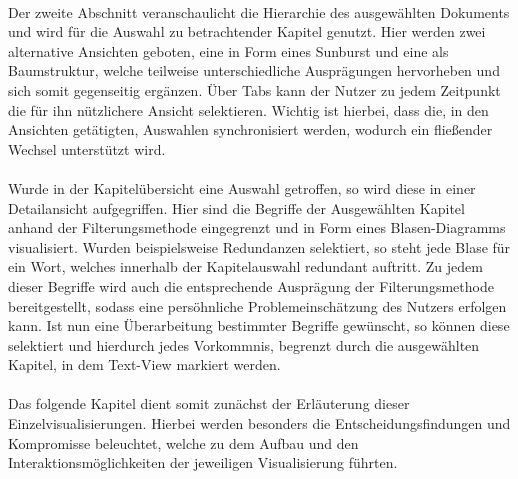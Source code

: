 \\
Der zweite Abschnitt veranschaulicht die Hierarchie des ausgew\"ahlten Dokuments und wird f\"ur die Auswahl zu betrachtender Kapitel genutzt. Hier werden zwei alternative Ansichten geboten, eine in Form eines Sunburst und eine als Baumstruktur, welche teilweise unterschiedliche Auspr\"agungen hervorheben und sich somit gegenseitig erg\"anzen. \"Uber Tabs kann der Nutzer zu jedem Zeitpunkt die f\"ur ihn n\"utzlichere Ansicht selektieren. Wichtig ist hierbei, dass die, in den Ansichten get\"atigten, Auswahlen synchronisiert werden, wodurch ein flie{\ss}ender Wechsel unterst\"utzt wird. \\
\\
Wurde in der Kapitel\"ubersicht eine Auswahl getroffen, so wird diese in einer Detailansicht aufgegriffen. Hier sind die Begriffe der Ausgew\"ahlten Kapitel anhand der Filterungsmethode eingegrenzt und in Form eines Blasen-Diagramms visualisiert. Wurden beispielsweise Redundanzen selektiert, so steht jede Blase f\"ur ein Wort, welches innerhalb der Kapitelauswahl redundant auftritt. Zu jedem dieser Begriffe wird auch die entsprechende Auspr\"agung der Filterungsmethode bereitgestellt, sodass eine pers\"ohnliche Problemeinsch\"atzung des Nutzers erfolgen kann. Ist nun eine \"Uberarbeitung bestimmter Begriffe gew\"unscht, so k\"onnen diese selektiert und hierdurch jedes Vorkommnis, begrenzt durch die ausgew\"ahlten Kapitel, in dem Text-View markiert werden.\\
\\
Das folgende Kapitel dient somit zun\"achst der Erl\"auterung dieser Einzelvisualisierungen. Hierbei werden besonders die Entscheidungsfindungen und Kompromisse beleuchtet, welche zu dem Aufbau und den Interaktionsm\"oglichkeiten der jeweiligen Visualisierung f\"uhrten.
\newpage
